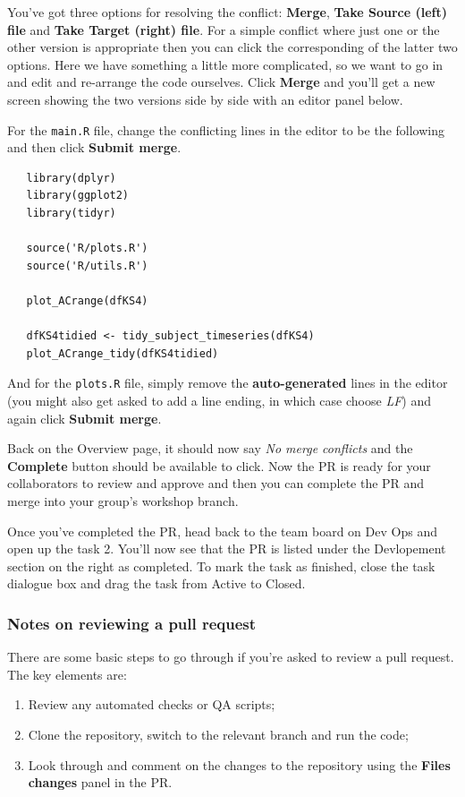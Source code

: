 \documentclass[
  12pt,
]{article}
\providecommand{\tightlist}{%
  \setlength{\itemsep}{0pt}\setlength{\parskip}{0pt}}
\begin{document}
You've got three options for resolving the conflict: \textbf{Merge},
\textbf{Take Source (left) file} and \textbf{Take Target (right) file}.
For a simple conflict where just one or the other version is appropriate
then you can click the corresponding of the latter two options. Here we
have something a little more complicated, so we want to go in and edit
and re-arrange the code ourselves. Click \textbf{Merge} and you'll get a
new screen showing the two versions side by side with an editor panel
below.

For the \texttt{main.R} file, change the conflicting lines in the editor
to be the following and then click \textbf{Submit merge}.

\begin{verbatim}
   library(dplyr)
   library(ggplot2)
   library(tidyr)

   source('R/plots.R')
   source('R/utils.R')

   plot_ACrange(dfKS4)

   dfKS4tidied <- tidy_subject_timeseries(dfKS4)
   plot_ACrange_tidy(dfKS4tidied)
\end{verbatim}

And for the \texttt{plots.R} file, simply remove the
\textbf{auto-generated} lines in the editor (you might also get asked to
add a line ending, in which case choose \emph{LF}) and again click
\textbf{Submit merge}.

Back on the Overview page, it should now say \emph{No merge conflicts}
and the \textbf{Complete} button should be available to click. Now the
PR is ready for your collaborators to review and approve and then you
can complete the PR and merge into your group's workshop branch.

Once you've completed the PR, head back to the team board on Dev Ops and
open up the task 2. You'll now see that the PR is listed under the
Devlopement section on the right as completed. To mark the task as
finished, close the task dialogue box and drag the task from Active to
Closed.

\hypertarget{notes-on-reviewing-a-pull-request}{%
\subsubsection{Notes on reviewing a pull
request}\label{notes-on-reviewing-a-pull-request}}

There are some basic steps to go through if you're asked to review a
pull request. The key elements are:

\begin{enumerate}
\def\labelenumi{\arabic{enumi}.}
\tightlist
\item
  Review any automated checks or QA scripts;
\item
  Clone the repository, switch to the relevant branch and run the code;
\item
  Look through and comment on the changes to the repository using the
  \textbf{Files changes} panel in the PR.
\end{enumerate}
\end{document}
